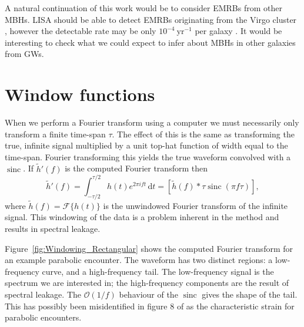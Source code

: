 \documentclass[useAMS,usedcolumn,usegraphicx,usenatbib]{mn2e}
\newcommand{\Figref}[1]{Figure~\ref{fig:#1}}
\newcommand{\units}[1]{\ensuremath{~\mathrm{#1}}}
\DeclareMathOperator{\sinc}{sinc}
\newcommand{\dd}{\ensuremath{\mathrm{d}}}
\newcommand{\intd}[4]{\ensuremath{\int_{#1}^{#2}{#3}\,\dd{#4}}}
\newcommand{\order}[1]{\ensuremath{\mathcal{O}({#1})}}
\begin{document}
A natural continuation of this work would be to consider EMRBs from other MBHs. LISA should be able to detect EMRBs originating from the Virgo cluster \citep{Rubbo2006}, however the detectable rate may be only $10^{-4}\units{yr^{-1}}$ per galaxy \citep{Hopman2007}. It would be interesting to check what we could expect to infer about MBHs in other galaxies from GWs.




\appendix

\section{Window functions}\label{ap:window}

When we perform a Fourier transform using a computer we must necessarily only transform a finite time-span $\tau$. The effect of this is the same as transforming the true, infinite signal multiplied by a unit top-hat function of width equal to the time-span. Fourier transforming this yields the true waveform convolved with a $\sinc$. If $\tilde{h}'(f)$ is the computed Fourier transform then
\begin{equation}
\tilde{h}'(f) = \intd{-\tau/2}{\tau/2}{h(t)e^{2\pi i ft}}{t} = \left[\tilde{h}(f) \ast \tau \sinc(\pi f\tau)\right],
\end{equation}
where $\tilde{h}(f) = \mathscr{F}\{h(t)\}$ is the unwindowed Fourier transform of the infinite signal. This windowing of the data is a problem inherent in the method and results in spectral leakage.

\Figref{Windowing_Rectangular} shows the computed Fourier transform for an example parabolic encounter. The waveform has two distinct regions: a low-frequency curve, and a high-frequency tail. The low-frequency signal is the spectrum we are interested in; the high-frequency components are the result of spectral leakage. The $\order{1/{f}}$ behaviour of the $\sinc$ gives the shape of the tail. This has possibly been misidentified in figure 8 of \citet{Burko2007} as the characteristic strain for parabolic encounters.
\end{document}

